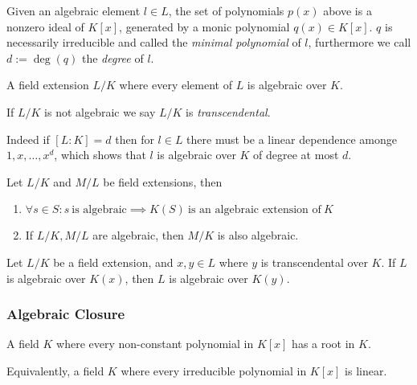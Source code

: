 Given an algebraic element \(l \in L\), the set of polynomials \(p(x)\) above is a nonzero ideal of \(K[x]\), generated by a monic polynomial \(q(x) \in K[x]\).
\(q\) is necessarily irreducible and called the \emph{minimal polynomial} of \(l\), furthermore we call \(d := \deg(q)\) the \emph{degree} of \(l\).

\begin{definition}
   A field extension \(L/K\) where every element of \(L\) is algebraic over \(K\).
\end{definition}
\begin{remark}[Terminology]
   If \(L/K\) is not algebraic we say \(L/K\) is \emph{transcendental}.
\end{remark}
\begin{remark}
   Indeed if \([L:K] = d\) then for \(l \in L\) there must be a linear dependence amonge \(1, x, \ldots, x^d\), which shows that \(l\) is algebraic over \(K\) of degree at most \(d\).
\end{remark}

\begin{proposition}
   Let \(L/K\) and \(M/L\) be field extensions, then
   \begin{enumerate}[label=\roman*, align=Center]
      \item \(\forall s \in S: s~\text{is algebraic} \implies K(S)~\text{is an algebraic extension of}~K\)
      \item If \(L/K, M/L\) are algebraic, then \(M/K\) is also algebraic.
   \end{enumerate}
\end{proposition}

\begin{lemma}
   Let \(L/K\) be a field extension, and \(x, y \in L\) where \(y\) is transcendental over \(K\).
   If \(L\) is algebraic over \(K(x)\), then \(L\) is algebraic over \(K(y)\).
\end{lemma}

\subsubsection{Algebraic Closure}
\begin{definition}
   A field \(K\) where every non-constant polynomial in \(K[x]\) has a root in \(K\).
\end{definition}
\begin{remark}
   Equivalently, a field \(K\) where every irreducible polynomial in \(K[x]\) is linear.
\end{remark}

